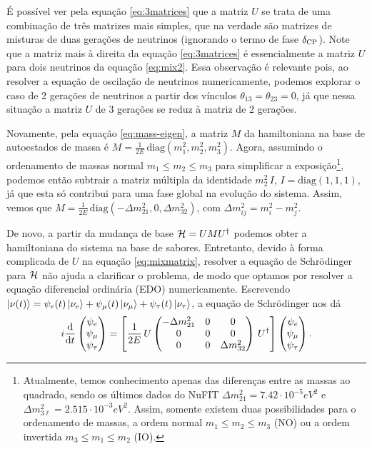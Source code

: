 \documentclass[12pt]{report}
\begin{document}
É possível ver pela equação \ref{eq:3matrices} que a matriz $U$ se trata de uma combinação de três matrizes mais simples, que na verdade são matrizes de misturas de duas gerações de neutrinos (ignorando o termo de fase $\delta_{\text{CP}}$). Note que a matriz mais à direita da equação \ref{eq:3matrices} é essencialmente a matriz $U$ para dois neutrinos da equação \ref{eq:mix2}. Essa observação é relevante pois, ao resolver a equação de oscilação de neutrinos numericamente, podemos explorar o caso de 2 gerações de neutrinos a partir dos vínculos $\theta_{13} = \theta_{23} = 0$, já que nessa situação a matriz $U$ de 3 gerações se reduz à matriz de 2 gerações.

Novamente, pela equação \ref{eq:mass-eigen}, a matriz $M$ da hamiltoniana na base de autoestados de massa é $M = \frac{1}{2E} \, \text{diag}(m_1^2, m_2^2, m_3^2)$. Agora, assumindo o ordenamento de massas normal $m_1 \leq m_2 \leq m_3$ para simplificar a exposição\footnote{Atualmente, temos conhecimento apenas das diferenças entre as massas ao quadrado, sendo os últimos dados do NuFIT $\Delta m_{21}^2 = 7.42 \cdot 10^{-5} \unit{eV^2}$ e $\Delta m_{3\ell}^2 = 2.515 \cdot 10^{-3} \unit{eV^2}$. Assim, somente existem duas possibilidades para o ordenamento de massas, a ordem normal $m_1 \leq m_2 \leq m_3$ (NO) ou a ordem invertida $m_3 \leq m_1 \leq m_2$ (IO).}, podemos então subtrair a matriz múltipla da identidade $m_2^2 \, I$, $I = \text{diag}(1,1,1)$, já que esta só contribui para uma fase global na evolução do sistema. Assim, vemos que $M = \frac{1}{2E} \, \text{diag}(- \Delta m_{21}^2, 0, \Delta m_{32}^2)$, com $\Delta m_{ij}^2 = m_i^2 - m_j^2$.

De novo, a partir da mudança de base $\mathcal{H} = U M U^\dagger$ podemos obter a hamiltoniana do sistema na base de sabores. Entretanto, devido à forma complicada de $U$ na equação \ref{eq:mixmatrix}, resolver a equação de Schrödinger para $\mathcal{H}$ não ajuda a clarificar o problema, de modo que optamos por resolver a equação diferencial ordinária (EDO) numericamente. Escrevendo $\ket{\nu(t)} = \psi_e(t) \ket{\nu_e} + \psi_\mu(t) \ket{\nu_\mu} + \psi_\tau(t) \ket{\nu_\tau}$, a equação de Schrödinger nos dá
\begin{equation} \label{eq:3nu-vacuo}
i \dv{t}
\begin{pmatrix}
\psi_e \\ \psi_\mu \\ \psi_\tau
\end{pmatrix}
=
\qty[ \frac{1}{2E} \, U
\begin{pmatrix}
-\Delta m_{21}^2 & 0 & 0 \\
0 & 0 & 0 \\
0 & 0 & \Delta m_{32}^2 \\
\end{pmatrix}
\, U^\dagger ]
\begin{pmatrix}
\psi_e \\ \psi_\mu \\ \psi_\tau
\end{pmatrix}.
\end{equation}
\end{document}
